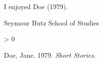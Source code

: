 
%
\newlength{\cslhangindent}
\setlength{\cslhangindent}{1.5em}
\newlength{\csllabelwidth}
\setlength{\csllabelwidth}{3em}
\newenvironment{CSLReferences}[2] %
 {%
  \setlength{\parindent}{0pt}
  \ifodd #1 \everypar{\setlength{\hangindent}{\cslhangindent}}\ignorespaces\fi
  \ifnum #2 > 0
  \setlength{\parskip}{#2\baselineskip}
  \fi
 }%
 {}
\usepackage{calc}
\newcommand{\CSLBlock}[1]{#1\hfill\break}
\newcommand{\CSLLeftMargin}[1]{\parbox[t]{\csllabelwidth}{#1}}
\newcommand{\CSLRightInline}[1]{\parbox[t]{\linewidth - \csllabelwidth}{#1}\break}
\newcommand{\CSLIndent}[1]{\hspace{\cslhangindent}#1}



I enjoyed Doe (1979).

Seymour Butz
School of Studies


\hypertarget{refs}{}
\begin{CSLReferences}{1}{0}
\leavevmode\hypertarget{ref-Doe}{}%
Doe, Jane. 1979. \emph{Short Stories}.

\end{CSLReferences}


%





